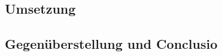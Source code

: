 \begin{spacing}{1}
	\chapter{Umsetzung}\label{chapter:implementation}
\end{spacing}


\begin{spacing}{1}
	\chapter{Gegenüberstellung und Conclusio}
\end{spacing}


\newpage
{}
\setcounter{page}{\value{RPages}}

\glsnogroupskiptrue
\printglossary[title=Glossar,toctitle=Glossar] %
\listoffigures
\listoftables
\lstlistoflistings
\appendix
{}


